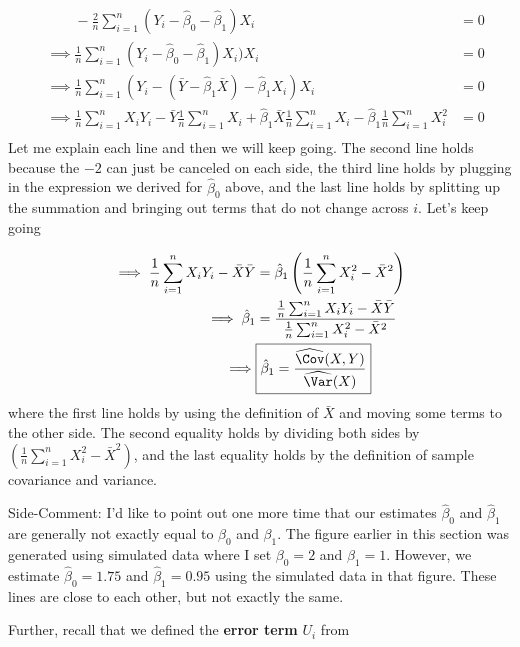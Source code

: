 \documentclass[
  letterpaper,
  DIV=11,
  numbers=noendperiod]{scrreprt}
\begin{document}
\[
  \begin{aligned}
  & \phantom{\implies} -\frac{2}{n} \sum_{i=1}^n (Y_i - \hat{\beta}_0 - \hat{\beta}_1) X_i &= 0 \\
  & \implies  \frac{1}{n} \sum_{i=1}^n (Y_i - \hat{\beta}_0 - \hat{\beta}_1) X_i) X_i &= 0 \\
  & \implies  \frac{1}{n} \sum_{i=1}^n (Y_i - (\bar{Y} - \hat{\beta}_1 \bar{X}) - \hat{\beta}_1 X_i) X_i &= 0 \\
  & \implies  \frac{1}{n} \sum_{i=1}^n X_i Y_i - \bar{Y} \frac{1}{n} \sum_{i=1}^n X_i + \hat{\beta}_1 \bar{X} \frac{1}{n} \sum_{i=1}^n X_i - \hat{\beta}_1 \frac{1}{n} \sum_{i=1}^n X_i^2 &= 0  \\
\end{aligned}
\] Let me explain each line and then we will keep going. The second line
holds because the \(-2\) can just be canceled on each side, the third
line holds by plugging in the expression we derived for
\(\hat{\beta}_0\) above, and the last line holds by splitting up the
summation and bringing out terms that do not change across \(i\). Let's
keep going

\[
\begin{aligned}
  \implies  \frac{1}{n} \sum_{i=1}^n X_i Y_i - \bar{X}\bar{Y} &= \hat{\beta}_1\left(\frac{1}{n} \sum_{i=1}^n X_i^2 - \bar{X}^2 \right) \\
  \implies  \hat{\beta}_1 &= \frac{\frac{1}{n} \sum_{i=1}^n X_i Y_i - \bar{X}\bar{Y}}{\frac{1}{n} \sum_{i=1}^n X_i^2 - \bar{X}^2} \\
  \implies  & \boxed{\hat{\beta}_1 = \frac{\widehat{\Cov}(X,Y)}{\widehat{\Var}(X)}}
  \end{aligned}
\] where the first line holds by using the definition of \(\bar{X}\) and
moving some terms to the other side. The second equality holds by
dividing both sides by
\(\left(\frac{1}{n} \displaystyle \sum_{i=1}^n X_i^2 - \bar{X}^2 \right)\),
and the last equality holds by the definition of sample covariance and
variance.

{Side-Comment:} I'd like to point out one more time that our estimates
\(\hat{\beta}_0\) and \(\hat{\beta}_1\) are generally not exactly equal
to \(\beta_0\) and \(\beta_1\). The figure earlier in this section was
generated using simulated data where I set \(\beta_0=2\) and
\(\beta_1=1\). However, we estimate \(\hat{\beta}_0 = 1.75\) and
\(\hat{\beta}_1 = 0.95\) using the simulated data in that figure. These
lines are close to each other, but not exactly the same.

Further, recall that we defined the \textbf{error term} \(U_i\) from
\end{document}
